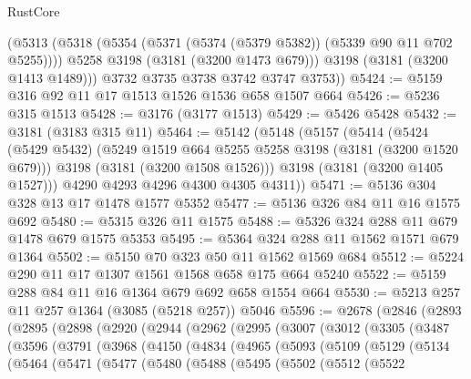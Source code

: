 \begin{lexlean}{RustCore}
\begin{coremodule}
          (@5313
            (@5318 (@5354 (@5371 (@5374 (@5379 @5382)) (@5339 @90 @11 @702 @5255))))
            @5258
            @3198
            (@3181 (@3200 @1473 @679)))
          @3198
          (@3181 (@3200 @1413 @1489)))
        @3732
        @3735
        @3738
        @3742
        @3747
        @3753))
@5424 := @5159 @316 @92 @11 @17 @1513 @1526 @1536 @658 @1507 @664
@5426 := @5236 @315 @1513
@5428 := @3176 (@3177 @1513)
@5429 := @5426 @5428
@5432 := @3181 (@3183 @315 @11)
@5464 := @5142
    (@5148
      (@5157
        (@5414
          (@5424
            (@5429 @5432)
            (@5249 @1519 @664 @5255 @5258 @3198 (@3181 (@3200 @1520 @679)))
            @3198
            (@3181 (@3200 @1508 @1526)))
          @3198
          (@3181 (@3200 @1405 @1527)))
        @4290
        @4293
        @4296
        @4300
        @4305
        @4311))
@5471 := @5136 @304 @328 @13 @17 @1478 @1577 @5352
@5477 := @5136 @326 @84 @11 @16 @1575 @692
@5480 := @5315 @326 @11 @1575
@5488 := @5326 @324 @288 @11 @679 @1478 @679 @1575 @5353
@5495 := @5364 @324 @288 @11 @1562 @1571 @679 @1364
@5502 := @5150 @70 @323 @50 @11 @1562 @1569 @684
@5512 := @5224 @290 @11 @17 @1307 @1561 @1568 @658 @175 @664 @5240
@5522 := @5159 @288 @84 @11 @16 @1364 @679 @692 @658 @1554 @664
@5530 := @5213 @257 @11 @257 @1364 (@3085 (@5218 @257)) @5046
@5596 := @2678
    (@2846
      (@2893
        (@2895
          (@2898
            (@2920
              (@2944
                (@2962
                  (@2995
                    (@3007
                      (@3012
                        (@3305
                          (@3487
                            (@3596
                              (@3791
                                (@3968
                                  (@4150
                                    (@4834
                                      (@4965
                                        (@5093
                                          (@5109
                                            (@5129
                                              (@5134
                                                (@5464
                                                  (@5471
                                                    (@5477
                                                      (@5480
                                                        (@5488
                                                          (@5495
                                                            (@5502
                                                              (@5512
                                                                (@5522

\end{coremodule}
\end{lexlean}
